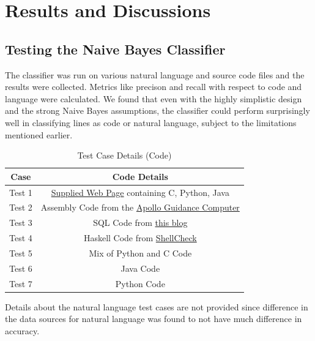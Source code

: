 \documentclass[12pt]{scrreprt}
\begin{document}
\chapter{Results and Discussions}


\section{Testing the Naive Bayes Classifier}

The classifier was run on various natural language and source code files and the results were collected. Metrics like precison and recall with respect to code and language were calculated. We found that even with the highly simplistic design and the strong Naive Bayes assumptions, the classifier could perform surprisingly well in classifying lines as code or natural language, subject to the limitations mentioned earlier.



\begin{table}[h]
    \centering
    \begin{tabular}{|c|c|}
        \hline
        \textbf{Case} & Code Details \\
        \hline
        Test 1 & \href{https://eli.thegreenplace.net/2018/type-erasure-and-reification/}{Supplied Web Page} containing C, Python, Java \\
        \hline
        Test 2 & Assembly Code from the \href{https://github.com/chrislgarry/Apollo-11/blob/master/Luminary099/AOSTASK_AND_AOSJOB.agc}{Apollo Guidance Computer} \\
        \hline
        Test 3 & SQL Code from \href{https://dev.to/tyzia/example-of-complex-sql-query-to-get-as-much-data-as-possible-from-database-9he}{this blog} \\
        \hline
        Test 4 & Haskell Code from \href{https://github.com/koalaman/shellcheck}{ShellCheck}\\
        \hline
        Test 5 & Mix of Python and C Code\\
        \hline
        Test 6 & Java Code\\
        \hline
        Test 7 & Python Code\\
        \hline
    \end{tabular}
    \caption{Test Case Details (Code)}
    \label{tab:results}
\end{table}
Details about the natural language test cases are not provided since difference in the data sources for natural language was found to not have much difference in accuracy.
\end{document}

